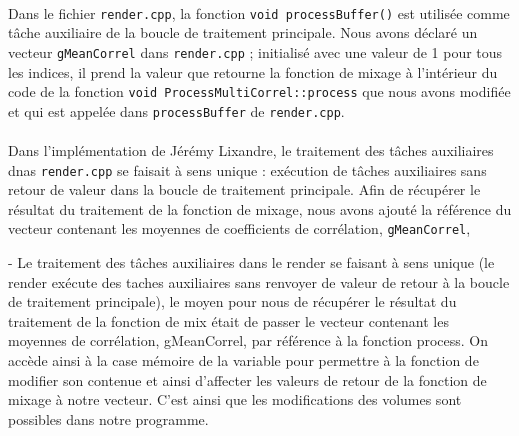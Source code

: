 
\paragraph{}
Dans le fichier \verb!render.cpp!, la fonction
\verb!void processBuffer()! est utilisée comme tâche auxiliaire de la
boucle de traitement principale. Nous avons déclaré un vecteur
\verb!gMeanCorrel! dans \verb!render.cpp! ; initialisé avec une valeur
de 1 pour tous les indices, il prend la valeur que retourne la
fonction de mixage à l'intérieur du code de la fonction
\verb!void ProcessMultiCorrel::process!
que nous avons modifiée et qui est appelée dans \verb!processBuffer!
de \verb!render.cpp!.
\paragraph{}
Dans l'implémentation de Jérémy Lixandre, le traitement des tâches auxiliaires dnas \verb!render.cpp! se faisait à sens unique : exécution de tâches auxiliaires sans retour de valeur dans la boucle de traitement principale. Afin de récupérer le résultat du traitement de la fonction de mixage, nous avons ajouté la référence du vecteur contenant les moyennes de coefficients de corrélation, \verb!gMeanCorrel!, %

  - Le traitement des tâches auxiliaires dans le render se faisant à sens
  unique (le render exécute des taches auxiliaires sans renvoyer de valeur de
  retour à la boucle de traitement principale), le moyen pour nous de récupérer
  le résultat du traitement de la fonction de mix était de passer le vecteur
  contenant les moyennes de corrélation, gMeanCorrel, par référence à la
  fonction process. On accède ainsi à la case mémoire de la variable pour
  permettre à la fonction de modifier son contenue et ainsi d'affecter les
  valeurs de retour de la fonction de mixage à notre vecteur. C'est ainsi que
  les modifications des volumes sont possibles dans notre programme.

